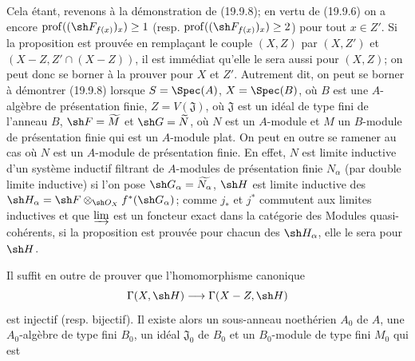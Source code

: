 Cela étant, revenons à la démonstration de (19.9.8); en vertu de (19.9.6) on a encore $\operatorname{prof}((\sh F_{f(x)})_x)\geq1$ (resp. $\operatorname{prof}((\sh F_{f(x)})_x)\geq2$) pour tout $x\in Z'$. Si la proposition est prouvée en remplaçant le couple $(X,Z)$ par $(X,Z')$ et $(X-Z,Z'\cap(X-Z))$, il est immédiat qu'elle le sera aussi pour $(X,Z)$; on peut donc se borner à la prouver pour $X$ et $Z'$. Autrement dit, on peut se borner à démontrer (19.9.8) lorsque $S=\Spec(A)$, $X=\Spec(B)$, où $B$ est une $A$-algèbre de présentation finie, $Z=V(\mathfrak J)$, où $\mathfrak J$ est un idéal de type fini de l'anneau $B$, $\sh F=\widetilde M$ et $\sh G=\widetilde N$, où $N$ est un $A$-module et $M$ un $B$-module de présentation finie qui est un $A$-module plat. On peut en outre se ramener au cas où $N$ est un $A$-module de présentation finie. En effet, $N$ est limite inductive d'un système inductif filtrant de $A$-modules de présentation finie $N_\alpha$ (par double limite inductive) si l'on pose $\sh G_\alpha=\widetilde{N_\alpha}$, $\sh H$ est limite inductive des $\sh H_\alpha=\sh F\otimes_{\sh O_X}f^*(\sh G_\alpha)$; comme $j_*$ et $j^*$ commutent aux limites inductives et que $\varinjlim$ est un foncteur exact dans la catégorie des Modules quasi-cohérents, si la proposition est prouvée pour chacun des $\sh H_\alpha$, elle le sera pour $\sh H$.

Il suffit en outre de prouver que l'homomorphisme canonique
\[
  \Gamma(X,\sh H)\longrightarrow\Gamma(X-Z,\sh H)
\]
est injectif (resp. bijectif). Il existe alors un sous-anneau noethérien $A_0$ de $A$, une $A_0$-algèbre de type fini $B_0$, un idéal $\mathfrak J_0$ de $B_0$ et un $B_0$-module de type fini $M_0$ qui est


